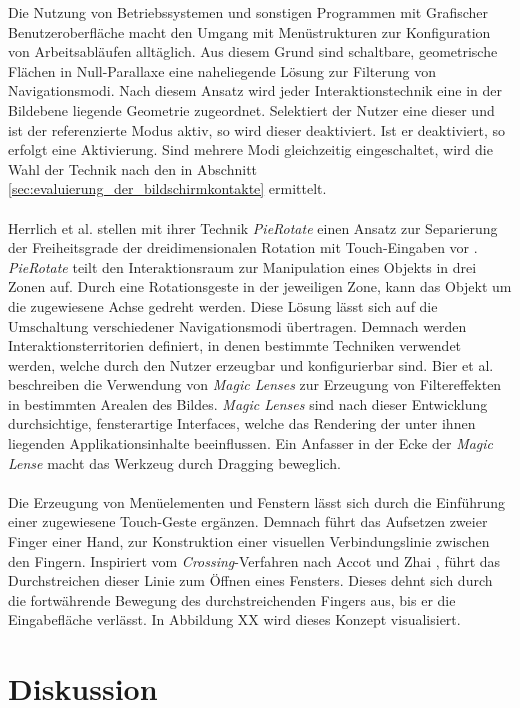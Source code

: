 Die Nutzung von Betriebssystemen und sonstigen Programmen mit Grafischer Benutzeroberfläche macht den Umgang mit Menüstrukturen zur Konfiguration von Arbeitsabläufen alltäglich. Aus diesem Grund sind schaltbare, geometrische Flächen in Null-Parallaxe eine naheliegende Lösung zur Filterung von Navigationsmodi. Nach diesem Ansatz wird jeder Interaktionstechnik eine in der Bildebene liegende Geometrie zugeordnet. Selektiert der Nutzer eine dieser und ist der referenzierte Modus aktiv, so wird dieser deaktiviert. Ist er deaktiviert, so erfolgt eine Aktivierung. Sind mehrere Modi gleichzeitig eingeschaltet, wird die Wahl der Technik nach den in Abschnitt \ref{sec:evaluierung_der_bildschirmkontakte} ermittelt.   
\\\\
Herrlich et al. stellen mit ihrer Technik \emph{PieRotate} einen Ansatz zur Separierung der Freiheitsgrade der dreidimensionalen Rotation mit Touch-Eingaben vor \cite{herrlich:2011}. \emph{PieRotate} teilt den Interaktionsraum zur Manipulation eines Objekts in drei Zonen auf. Durch eine Rotationsgeste in der jeweiligen Zone, kann das Objekt um die zugewiesene Achse gedreht werden. Diese Lösung lässt sich auf die Umschaltung verschiedener Navigationsmodi übertragen. Demnach werden Interaktionsterritorien definiert, in denen bestimmte Techniken verwendet werden, welche durch den Nutzer erzeugbar und konfigurierbar sind. Bier et al. beschreiben die Verwendung von \emph{Magic Lenses} zur Erzeugung von Filtereffekten in bestimmten Arealen des Bildes. \emph{Magic Lenses} sind nach dieser Entwicklung durchsichtige, fensterartige Interfaces, welche das Rendering der unter ihnen liegenden Applikationsinhalte beeinflussen. Ein Anfasser in der Ecke der \emph{Magic Lense} macht das Werkzeug durch Dragging beweglich.
\\\\
Die Erzeugung von Menüelementen und Fenstern lässt sich durch die Einführung einer zugewiesene Touch-Geste ergänzen. Demnach führt das Aufsetzen zweier Finger einer Hand, zur Konstruktion einer visuellen Verbindungslinie zwischen den Fingern. Inspiriert vom \emph{Crossing}-Verfahren nach Accot und Zhai \cite{accot:2002}, führt das Durchstreichen dieser Linie zum Öffnen eines Fensters. Dieses dehnt sich durch die fortwährende Bewegung des durchstreichenden Fingers aus, bis er die Eingabefläche verlässt. In Abbildung XX wird dieses Konzept visualisiert.


\section{Diskussion}
\label{sec:diskussion_wechsel}

